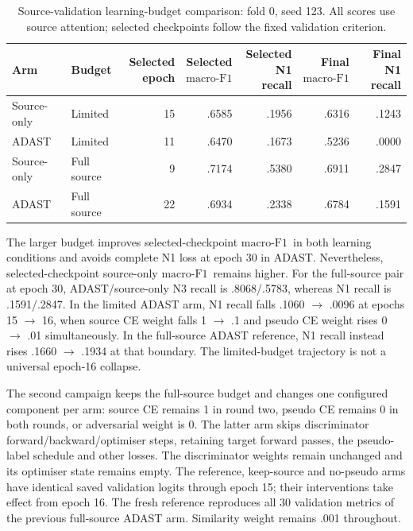 \documentclass[10pt,a4paper]{article}
\newcommand{\mf}{\ensuremath{\mathrm{macro\text{-}F1}}}
\begin{document}
\begin{table}[H]
\centering\small
\caption{Source-validation learning-budget comparison: fold 0, seed 123.
All scores use source attention; selected checkpoints follow the fixed validation criterion.}
\label{tab:sup_adast_budget_development}
\begin{tabular}{llrrrrr}
\toprule
Arm & Budget & \shortstack{Selected\\epoch} & \shortstack{Selected\\\mf} & \shortstack{Selected\\N1 recall} & \shortstack{Final\\\mf} & \shortstack{Final\\N1 recall} \\
\midrule
Source-only & Limited & 15 & .6585 & .1956 & .6316 & .1243 \\
ADAST & Limited & 11 & .6470 & .1673 & .5236 & .0000 \\
Source-only & Full source & 9 & .7174 & .5380 & .6911 & .2847 \\
ADAST & Full source & 22 & .6934 & .2338 & .6784 & .1591 \\
\bottomrule
\end{tabular}
\end{table}

The larger budget improves selected-checkpoint \mf\ in both learning conditions and avoids
complete N1 loss at epoch 30 in ADAST. Nevertheless, selected-checkpoint source-only \mf\
remains higher. For the full-source pair at epoch 30, ADAST/source-only N3 recall is
.8068/.5783, whereas N1 recall is .1591/.2847. In the limited ADAST arm, N1 recall falls
.1060 $\rightarrow$ .0096 at epochs 15 $\rightarrow$ 16, when source CE weight falls
1 $\rightarrow$ .1 and pseudo CE weight rises 0 $\rightarrow$ .01 simultaneously.
In the full-source ADAST reference, N1 recall instead rises .1660 $\rightarrow$ .1934
at that boundary. The limited-budget trajectory is not a universal epoch-16 collapse.

The second campaign keeps the full-source budget and changes one configured component per
arm: source CE remains 1 in round two, pseudo CE remains 0 in both rounds, or adversarial
weight is 0. The latter arm skips discriminator forward/backward/optimiser steps, retaining
target forward passes, the pseudo-label schedule and other losses. The discriminator weights
remain unchanged and its optimiser state remains empty. The reference, keep-source and
no-pseudo arms have identical saved validation logits through epoch 15; their interventions
take effect from epoch 16. The fresh reference reproduces all 30 validation metrics of the
previous full-source ADAST arm. Similarity weight remains .001 throughout.
\end{document}
